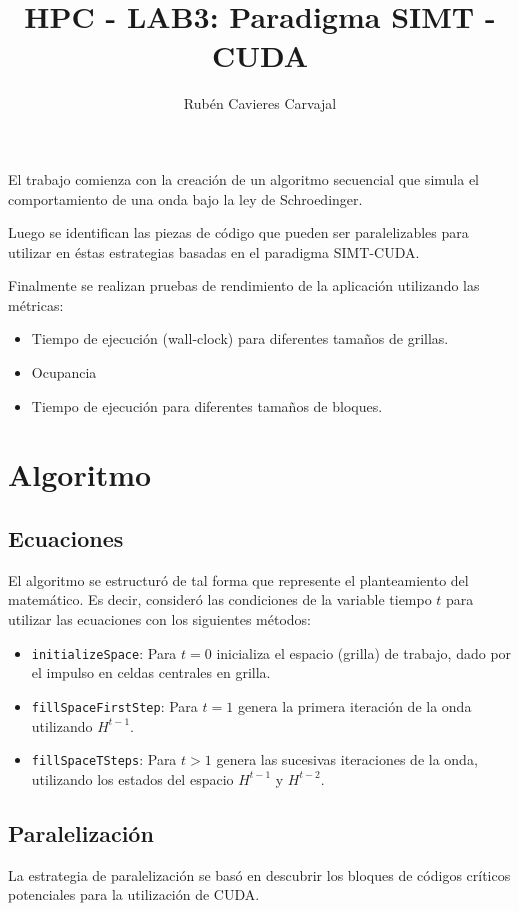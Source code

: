 \documentclass[jou]{apa6}
\title{HPC - LAB3: Paradigma SIMT - CUDA}
\author{Rubén Cavieres Carvajal}
\affiliation{Universidad de Santiago de Chile}
\begin{document}
\maketitle
El trabajo comienza con la creación de un algoritmo secuencial que simula el comportamiento de una onda bajo la ley de Schroedinger.

Luego se identifican las piezas de código que pueden ser paralelizables para utilizar en éstas estrategias basadas en el paradigma SIMT-CUDA.

Finalmente se realizan pruebas de rendimiento de la aplicación utilizando las métricas:

\begin{itemize}
	\item Tiempo de ejecución (wall-clock) para diferentes tamaños de grillas.
	\item Ocupancia
	\item Tiempo de ejecución para diferentes tamaños de bloques.
\end{itemize}


\section{Algoritmo}
\subsection{Ecuaciones}
El algoritmo se estructuró de tal forma que represente el planteamiento del matemático. Es decir, consideró las condiciones de la variable tiempo $t$ para utilizar las ecuaciones con los siguientes métodos:

\begin{itemize}
	\item \texttt{initializeSpace}: Para $t = 0$ inicializa el espacio (grilla) de trabajo, dado por el impulso en celdas centrales en grilla.
	\item \texttt{fillSpaceFirstStep}: Para $t = 1$ genera la primera iteración de la onda utilizando $H^{t-1}$.
	\item \texttt{fillSpaceTSteps}: Para $t > 1$ genera las sucesivas iteraciones de la onda, utilizando los estados del espacio $H^{t-1}$ y $H^{t-2}$.
\end{itemize}

\subsection{Paralelización}
La estrategia de paralelización se basó en descubrir los bloques de códigos críticos potenciales para la utilización de CUDA.
\end{document}

